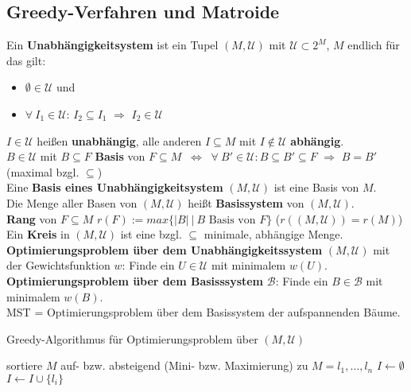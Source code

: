 \documentclass[a4paper,10pt]{scrartcl}
\newcommand{\tbf}{\textbf}
\newcommand{\Ra}{\Rightarrow}
\newcommand{\agn}{\leftarrow}
\newcommand{\Lra}{\Leftrightarrow}
\newcommand{\calB}{\mathcal{B}}
\newcommand{\calU}{\mathcal{U}}
\begin{document}
\subsection{Greedy-Verfahren und Matroide}
Ein \tbf{Unabhängigkeitsystem} ist ein Tupel $(M,\calU)$ mit $\calU \subset 2^M$, $M$ endlich für das gilt:
\begin{itemize}
 \item $\emptyset \in \calU$ und
 \item $\forall \ I_1 \in \calU$: $I_2 \subseteq I_1$ $\Ra$ $I_2 \in \calU$
\end{itemize}

$I \in \calU$ heißen \tbf{unabhängig}, alle anderen $I \subseteq M$ mit $I \not \in \calU$ \tbf{abhängig}. \\

$B \in \calU$ mit $B \subseteq F$ \tbf{Basis} von $F \subseteq M$ $\ \Lra \ $ $\forall \ B' \in \calU: B \subseteq B' \subseteq F$ $\Ra$ $B = B'$ (maximal bzgl. $\subseteq$)\\

Eine \tbf{Basis eines Unabhängigkeitsystem} $(M,\calU)$ ist eine Basis von $M$. \\

Die Menge aller Basen von $(M,\calU)$ heißt \tbf{Basissystem} von $(M,\calU)$. \\

\tbf{Rang} von $F \subseteq M$ $r(F) := max \{ |B| \ | \ B \text{ Basis von } F\}$ ($r((M,\calU)) = r(M)$) \\

Ein \tbf{Kreis} in $(M,\calU)$ ist eine bzgl. $\subseteq$ minimale, abhängige Menge. \\

\tbf{Optimierungsproblem über dem Unabhängigkeitssystem} $(M,\calU)$ mit der Gewichtsfunktion $w$: Finde ein $U \in \calU$ mit minimalem $w(U)$. \\

\tbf{Optimierungsproblem über dem Basisssystem} $\calB$: Finde ein $B \in \calB$ mit minimalem $w(B)$. \\

MST = Optimierungsproblem über dem Basissystem der aufspannenden Bäume. \\

\begin{algorithm}
\caption{Greedy-Algorithmus für Optimierungsproblem über $(M,\calU)$}
\begin{algorithmic}
\STATE sortiere $M$ auf- bzw. absteigend (Mini- bzw. Maximierung) zu $M = l_1, \ldots, l_n$
\STATE $I \agn \emptyset$
	\IF{$I \cup \{l_i\} \in \calU$}
		\STATE $I \agn I \cup \{l_i\}$
	\ENDIF
\ENDFOR
\end{algorithmic}
\end{algorithm}
\end{document}
